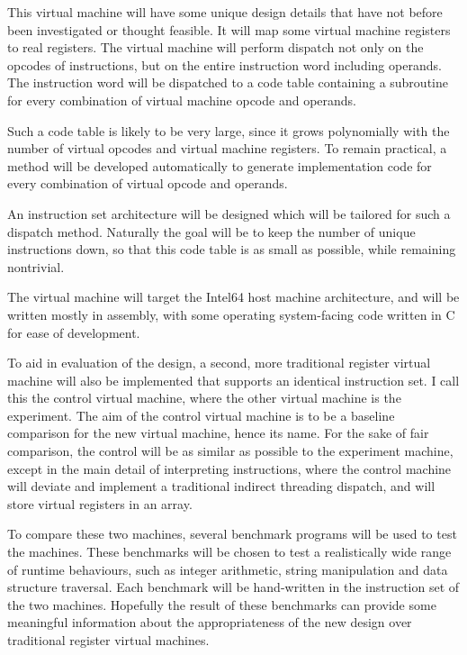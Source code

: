 		This virtual machine will have some unique design details that have not before been investigated or thought feasible. It will map some virtual machine registers to real registers. The virtual machine will perform dispatch not only on the opcodes of instructions, but on the entire instruction word including operands. The instruction word will be dispatched to a code table containing a subroutine for every combination of virtual machine opcode and operands. 
		
		Such a code table is likely to be very large, since it grows polynomially with the number of virtual opcodes and virtual machine registers. To remain practical, a method will be developed automatically to generate implementation code for every combination of virtual opcode and operands. 
	
		An instruction set architecture will be designed which will be tailored for such a dispatch method. Naturally the goal will be to keep the number of unique instructions down, so that this code table is as small as possible, while remaining nontrivial.
		
		The virtual machine will target the Intel64 host machine architecture, and will be written mostly in assembly, with some operating system-facing code written in C for ease of development. 
		
		To aid in evaluation of the design, a second, more traditional register virtual machine will also be implemented that supports an identical instruction set. I call this the control virtual machine, where the other virtual machine is the experiment.  The aim of the control virtual machine is to be a baseline comparison for the new virtual machine, hence its name. For the sake of fair comparison, the control will be as similar as possible to the experiment machine, except in the main detail of interpreting instructions, where the control machine will deviate and implement a traditional indirect threading dispatch, and will store virtual registers in an array.
		
		To compare these two machines, several benchmark programs will be used to test the machines. These benchmarks will be chosen to test a realistically wide range of runtime behaviours, such as integer arithmetic, string manipulation and data structure traversal. Each benchmark will be hand-written in the instruction set of the two machines. Hopefully the result of these benchmarks can provide some meaningful information about the appropriateness of the new design over traditional register virtual machines.
		
